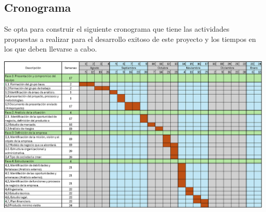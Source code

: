 \subsection{Cronograma}

Se opta para construir el siguiente cronograma que tiene las actividades propuestas a realizar para el desarrollo exitoso de este proyecto y los tiempos en los que deben llevarse a cabo.

\begin{adjustbox}{
    center,
    caption=[{Cronograma de actividades}]{\centering Cronograma de actividades Fuente: Autores},
    label={Cronograma},
    nofloat=figure, vspace={7px}}

    \includegraphics[width=1\textwidth]{Content/Images/cronogramaEmpre.PNG}

\end{adjustbox}
